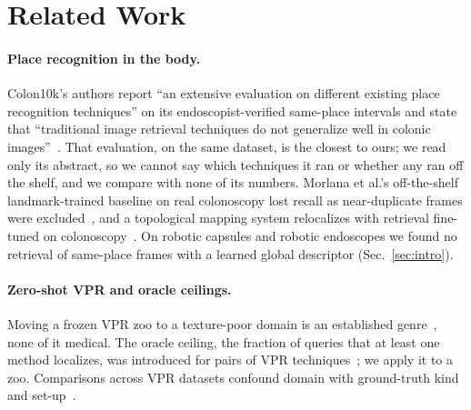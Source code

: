\section{Related Work}
\label{sec:related}

\paragraph{Place recognition in the body.}
Colon10k's authors report ``an extensive evaluation on different existing
place recognition techniques'' on its endoscopist-verified same-place
intervals and state that ``traditional image retrieval techniques do not
generalize well in colonic images''~\cite{ma2021colon10k}. That evaluation,
on the same dataset, is the closest to ours; we read only its abstract, so we
cannot say which techniques it ran or whether any ran off the shelf, and we
compare with none of its numbers. Morlana et al.'s
off-the-shelf landmark-trained baseline on real colonoscopy lost recall as
near-duplicate frames were excluded~\cite{morlana2021selfsupervised}, and a
topological mapping system relocalizes with retrieval fine-tuned on
colonoscopy~\cite{morlana2024colonmapper}. On robotic capsules and robotic
endoscopes we found no retrieval of same-place frames with a learned global
descriptor (Sec.~\ref{sec:intro}).

\paragraph{Zero-shot VPR and oracle ceilings.}
Moving a frozen VPR zoo to a texture-poor domain is an established
genre~\cite{keetha2024anyloc,larsen2026longterm}, none of it medical. The
oracle ceiling, the fraction of queries that at least one method localizes,
was introduced for pairs of VPR techniques~\cite{waheed2021improving}; we
apply it to a zoo. Comparisons across VPR datasets confound domain with
ground-truth kind and set-up~\cite{schubert2021makes}.
